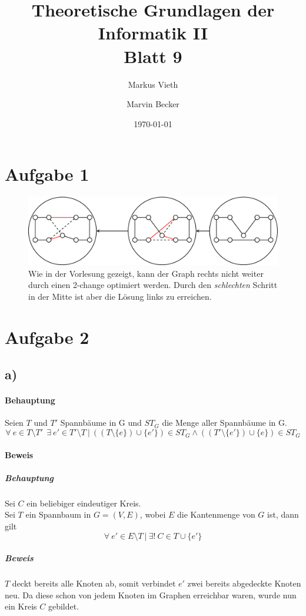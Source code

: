 \documentclass[a4paper,11pt,twoside]{scrartcl}
\title{Theoretische Grundlagen der Informatik II\\ Blatt 9}
\author{Markus Vieth \and Marvin Becker}
\date{\today}
\newcounter{beweis}
\begin{document}
\maketitle
\cleardoublepage
\pagestyle{myheadings}

\section*{Aufgabe 1}
\begin{figure}[h]
\centering
\includegraphics[width=1\linewidth]{Grafik/Aufgabe1}
\caption{Wie in der Vorlesung gezeigt, kann der Graph rechts nicht weiter durch einen 2-change optimiert werden. Durch den \textit{schlechten} Schritt in der Mitte ist aber die Lösung links zu erreichen.}
\label{fig:Aufgabe1}
\end{figure}
\section*{Aufgabe 2}
\subsection*{a)}
\paragraph{Behauptung}
Seien $T$ und $T'$ Spannbäume in G und $ST_G$ die Menge aller Spannbäume in G.\\
\[ \forall~e\in T\setminus T'~~\exists~e'\in T'\setminus T~|~((T\setminus  \{e\})\cup \{e'\}) \in ST_G \land ((T'\setminus \{e'\})\cup \{e\}) \in ST_G \]
\paragraph{Beweis}
\subparagraph{ Behauptung}
Sei $C$ ein beliebiger eindeutiger Kreis.\\
Sei $T$ ein Spannbaum in $G=(V,E)$, wobei $E$ die Kantenmenge von $G$ ist, dann gilt 
\[ \forall~ e'\in E\setminus T ~|~ \exists!~ C\in T\cup \{e'\} \]
\subparagraph{ Beweis}
$T$ deckt bereits alle Knoten ab, somit verbindet $e'$ zwei bereits abgedeckte Knoten neu. Da diese schon von jedem Knoten im Graphen erreichbar waren, wurde nun ein Kreis $C$ gebildet.
\end{document}
